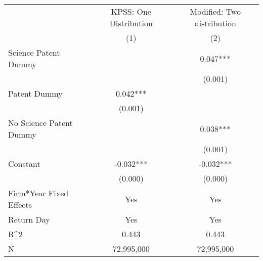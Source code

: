 {
\def\sym#1{\ifmmode^{#1}\else\(^{#1}\)\fi}
\begin{tabular}{l*{2}{c}}
\hline\hline
                    &\multicolumn{1}{c}{KPSS: One Distribution}&\multicolumn{1}{c}{Modified: Two distribution}\\\cmidrule(lr){2-2}\cmidrule(lr){3-3}
                    &\multicolumn{1}{c}{(1)}   &\multicolumn{1}{c}{(2)}   \\
\hline
Science Patent Dummy&               &       0.047***\\
                    &               &     (0.001)   \\
Patent Dummy        &       0.042***&               \\
                    &     (0.001)   &               \\
No Science Patent Dummy&               &       0.038***\\
                    &               &     (0.001)   \\
Constant            &      -0.032***&      -0.032***\\
                    &     (0.000)   &     (0.000)   \\
\hline
Firm*Year Fixed Effects&         Yes   &         Yes   \\
Return Day          &         Yes   &         Yes   \\
R^2                 &       0.443   &       0.443   \\
N                   &  72,995,000   &  72,995,000   \\
\hline\hline
\end{tabular}
}
